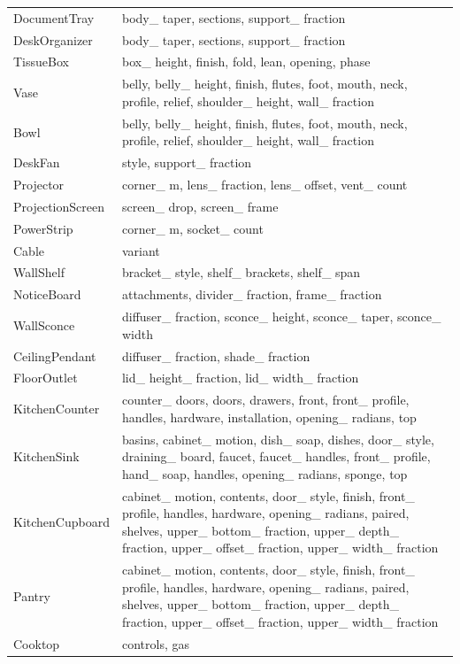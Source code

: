 \begin{longtable}{p{.20\linewidth}p{.74\linewidth}}
DocumentTray & body\_ taper, sections, support\_ fraction \\
DeskOrganizer & body\_ taper, sections, support\_ fraction \\
TissueBox & box\_ height, finish, fold, lean, opening, phase \\
Vase & belly, belly\_ height, finish, flutes, foot, mouth, neck, profile, relief, shoulder\_ height, wall\_ fraction \\
Bowl & belly, belly\_ height, finish, flutes, foot, mouth, neck, profile, relief, shoulder\_ height, wall\_ fraction \\
DeskFan & style, support\_ fraction \\
Projector & corner\_ m, lens\_ fraction, lens\_ offset, vent\_ count \\
ProjectionScreen & screen\_ drop, screen\_ frame \\
PowerStrip & corner\_ m, socket\_ count \\
Cable & variant \\
WallShelf & bracket\_ style, shelf\_ brackets, shelf\_ span \\
NoticeBoard & attachments, divider\_ fraction, frame\_ fraction \\
WallSconce & diffuser\_ fraction, sconce\_ height, sconce\_ taper, sconce\_ width \\
CeilingPendant & diffuser\_ fraction, shade\_ fraction \\
FloorOutlet & lid\_ height\_ fraction, lid\_ width\_ fraction \\
KitchenCounter & counter\_ doors, doors, drawers, front, front\_ profile, handles, hardware, installation, opening\_ radians, top \\
KitchenSink & basins, cabinet\_ motion, dish\_ soap, dishes, door\_ style, draining\_ board, faucet, faucet\_ handles, front\_ profile, hand\_ soap, handles, opening\_ radians, sponge, top \\
KitchenCupboard & cabinet\_ motion, contents, door\_ style, finish, front\_ profile, handles, hardware, opening\_ radians, paired, shelves, upper\_ bottom\_ fraction, upper\_ depth\_ fraction, upper\_ offset\_ fraction, upper\_ width\_ fraction \\
Pantry & cabinet\_ motion, contents, door\_ style, finish, front\_ profile, handles, hardware, opening\_ radians, paired, shelves, upper\_ bottom\_ fraction, upper\_ depth\_ fraction, upper\_ offset\_ fraction, upper\_ width\_ fraction \\
Cooktop & controls, gas \\

\end{longtable}
